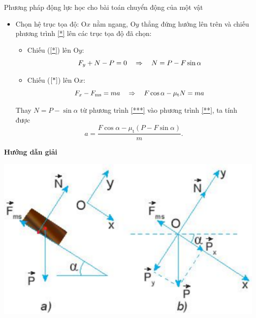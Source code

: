 \begin{dang}{Phương pháp động lực học cho bài toán chuyển động của một vật}
{\begin{itemize}
		\item Chọn hệ trục tọa độ: O$x$ nằm ngang, O$y$ thẳng đứng hướng lên trên và chiếu phương trình \eqref{*} lên các trục tọa độ đã chọn:
		\begin{itemize}
			\item Chiếu (\ref{*}) lên O$y$:
			\begin{equation}\label{***}
				F_y + N - P = 0 \\
				\quad\Rightarrow\quad N = P - F\sin \alpha
			\end{equation}
			\item Chiếu ($\ref{*}$) lên O$x$:
			\begin{equation}\label{**}
				F_x - F_\text{ms} = ma \\
				\quad\Rightarrow\quad F \cos \alpha - \mu_\text{t} N = ma
			\end{equation}
		\end{itemize}
		Thay $N = P - \sin \alpha$ từ phương trình \eqref{***} vào phương trình \eqref{**}, ta tính được 
		$$a=\dfrac{F \cos \alpha - \mu_\text{t} (P-F\sin \alpha)}{m}.$$
	\end{itemize}
}
{	\begin{center}
		\textbf{Hướng dẫn giải}
	\end{center}
	
	\begin{center}
		\includegraphics[scale=0.5]{../figs/G10-17-3}
	\end{center}
	
}
\end{dang}
